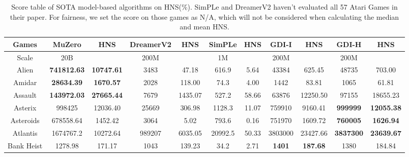 \documentclass[nohyperref]{article}
\newcommand{\best}[1]{\textbf{#1}}
\theoremstyle{plain}
\begin{document}
\begin{table}[!hb]
\footnotesize
\begin{center}
\caption{Score table of SOTA model-based algorithms on HNS(\%). SimPLe \citep{modelbasedatari} and DreamerV2\citep{dreamerv2} haven't evaluated all 57 Atari Games in their paper. For fairness, we set the score on those games as N/A, which will not be considered when calculating the median and mean HNS.}
\label{Tab:Score table of SOTA model-based algorithms on HNS.}
\setlength{\tabcolsep}{1.0pt}
\begin{tabular}{|c |c c| c c| c c| c c| c c|}
\hline
 Games              & MuZero         & HNS      & DreamerV2 & HNS    & SimPLe             & HNS          & GDI-I     & HNS & GDI-H & HNS \\
\hline
Scale               & 20B            &              & 200M      &            & 1M               &                  & 200M     &      &  200M   &\\
\hline  
 Alien              & \textbf{741812.63}      & \textbf{10747.61}     &3483       & 47.18      &616.9     & 5.64    & 43384       & 625.45                    &48735	             &703.00      \\
 Amidar             & \textbf{28634.39 }      & \textbf{1670.57    }  &2028       & 118.00     &74.3      & 4.00    & 1442        & 83.81                     &1065              &61.81 \\
 Assault            & \textbf{143972.03}      & \textbf{27665.44}     &7679       & 1435.07    &527.2     & 58.66   & 63876       & 12250.50                  &97155	             &18655.23\\
 Asterix            & 998425                  & 12036.40     &25669      & 306.98     &1128.3    & 11.07   & 759910      & 9160.41                   &\textbf{999999}   &\textbf{12055.38} \\
 Asteroids          & 678558.64             & 1452.42      &3064       & 5.02       &793.6     & 0.16               &751970& 1609.72           &\textbf{760005}            &\textbf{1626.94}  \\
 Atlantis           & 1674767.2             & 10272.64     &989207     & 6035.05    &20992.5   & 50.33              &3803000&23427.66          &\textbf{3837300}           &\textbf{23639.67}   \\
 Bank Heist         & 1278.98               & 171.17       &1043       & 139.23     &34.2      & 2.71               &\best{1401}  & \best{187.68  }           &1380              &184.84 \\

\end{tabular}
\end{center}
\end{table}
\end{document}
